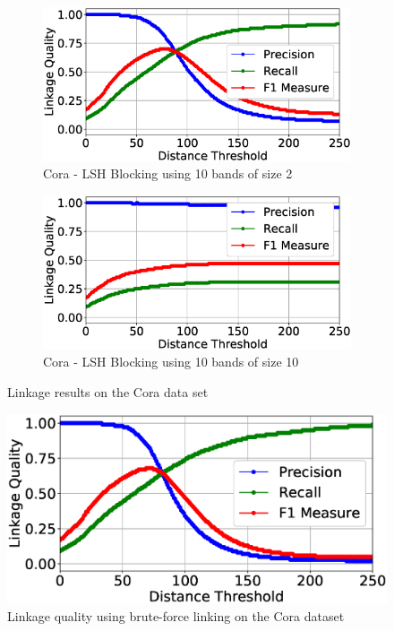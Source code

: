 \documentclass{llncs}
\begin{document}
\begin{figure}
\begin{subfigure}{.5\textwidth}
  \centering
\includegraphics[width=\textwidth]{figures/plotLQ-cora-lsh-10-2}
\caption{Cora - LSH Blocking using 10 bands of size 2}
\end{subfigure}%
\begin{subfigure}{.5\textwidth}
  \centering
\includegraphics[width=\textwidth]{figures/plotLQ-cora-lsh-10-10}
\caption{Cora - LSH Blocking using 10 bands of size 10}
\end{subfigure}


\caption{Linkage results on the Cora data set}
\label{demography-quality-mtree}
\end{figure}

\begin{figure}
\includegraphics[width=\textwidth]{figures/plotLQ-cora-brute}
\caption{Linkage quality using brute-force linking on the Cora dataset\label{fig-cora-brute}}
\end{figure}
\end{document}
